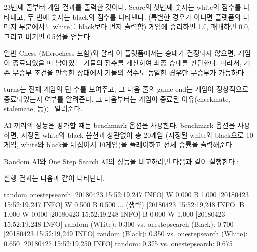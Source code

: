 \documentclass[letterpaper,10pt,english]{sphinxmanual}
\begin{document}
23번째 줄부터 게임 결과를 출력한 것이다. Score의 첫번째 숫자는 white의 점수를 나타내고, 두 번째 숫자는 black의 점수를 나타낸다.
(특별한 경우가 아니면 플랫폼의 나머지 부분에서도 white를 black보다 먼저 출력함)
게임에 승리하면 1.0, 패배하면 0.0, 그리고 비기면 0.5점을 얻는다.

일반 Chess (Microchess 포함)와 달리 이 플랫폼에서는 승패가 결정되지 않으면,
게임이 종료되었을 때 남아있는 기물의 점수를 계산하여 최종 승패를 판단한다.
따라서, 기존 무승부 조건을 만족한 상태에서 기물의 점수도 동일한 경우만 무승부가 가능하다.

turns는 전체 게임의 턴 수를 보여주고, 그 다음 줄의 game end는 게임이 정상적으로 종료되었는지 여부를 알려준다.
그 다음부터는 게임이 종료된 이유(checkmate, stalemate, 등)를 알려준다.

AI 끼리의 성능을 평가할 때는 benchmark 옵션을 사용한다. benchmark 옵션을 사용하면, 지정된 white와 black 옵션과 상관없이
총 20게임 (지정된 white와 black으로 10게임, white와 black을 뒤집어서 10게임)을 플레이하고 전체 승률을 출력해준다.


Random AI와 One Step Search AI의 성능을 비교하려면 다음과 같이 실행한다.:

%
\begin{sphinxVerbatim}[commandchars=\\\{\}]
    
\end{sphinxVerbatim}

실행 결과는 다음과 같이 나타난다.

%
\begin{sphinxVerbatim}          random          \textbar{}    one\PYGZus{}step\PYGZus{}search
[2018\PYGZhy{}04\PYGZhy{}23 15:52:19,247 INFO] W                  0.000 \textbar{} B                  1.000
[2018\PYGZhy{}04\PYGZhy{}23 15:52:19,247 INFO] W                  0.500 \textbar{} B                  0.500
... (생략)
[2018\PYGZhy{}04\PYGZhy{}23 15:52:19,248 INFO] B                  1.000 \textbar{} W                  0.000
[2018\PYGZhy{}04\PYGZhy{}23 15:52:19,248 INFO] B                  0.000 \textbar{} W                  1.000
[2018\PYGZhy{}04\PYGZhy{}23 15:52:19,248 INFO] random (White): 0.300 vs. one\PYGZus{}step\PYGZus{}search (Black): 0.700
[2018\PYGZhy{}04\PYGZhy{}23 15:52:19,249 INFO] random (Black): 0.350 vs. one\PYGZus{}step\PYGZus{}search (White): 0.650
[2018\PYGZhy{}04\PYGZhy{}23 15:52:19,250 INFO] random: 0.325 vs. one\PYGZus{}step\PYGZus{}search: 0.675
\end{sphinxVerbatim}
\end{document}
